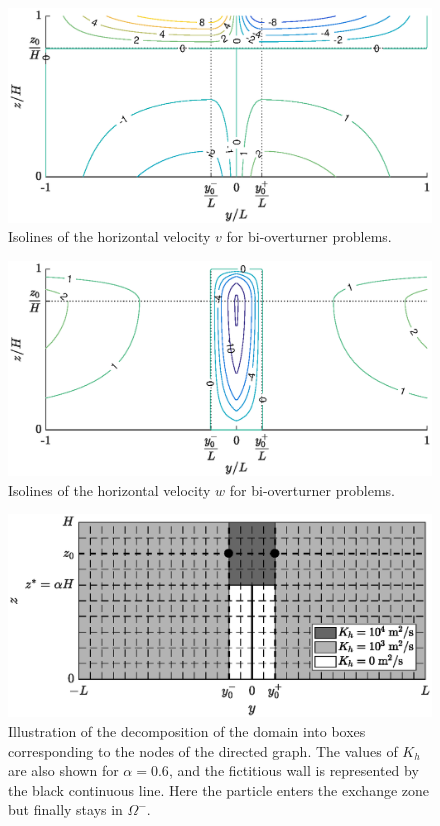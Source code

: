 \begin{figure}[!htp]
	\centering
	\includegraphics[width=\textwidth]{fig/problem2box/v2box_timmermans.eps}
	\caption{Isolines of the horizontal velocity $v$ for bi-overturner problems.}
	\label{fig:v2box}
\end{figure}

\begin{figure}[!htp]
	\centering
	\includegraphics[width=\textwidth]{fig/problem2box/w2box_timmermans.eps}
	\caption{Isolines of the horizontal velocity $w$ for bi-overturner problems.}
	\label{fig:w2box}
\end{figure}

\begin{figure}[!htp]
	\centering
	\includegraphics[width=\textwidth]{fig/problem2box/problem.eps}
	\caption{Illustration of the decomposition of the domain into boxes corresponding to the nodes of the directed graph. The values of $K_h$ are also shown for $\alpha = 0.6$, and the fictitious wall is represented by the black continuous line. Here the particle enters the exchange zone but finally stays in $\Omega^-$.}
	\label{fig:Kh2box}
\end{figure}

